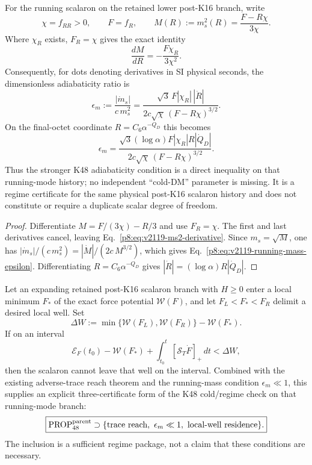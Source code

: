 \documentclass[12pt,a4paper]{article}
\begin{document}
\begin{corollary}
\label{p8:cor:v2119-running-mass-diagnostic}
For the running scalaron on the retained lower post-K16 branch, write
\[
 \chi=f_{RR}>0,
 \qquad F=f_R,
 \qquad M(R):=m_s^2(R)=\frac{F-R\chi}{3\chi}.
\]
Where $\chi_R$ exists, $F_R=\chi$ gives the exact identity
\begin{equation}
 \label{p8:eq:v2119-ms2-derivative}
 \boxed{
 \frac{dM}{dR}=-\frac{F\chi_R}{3\chi^2}.}
\end{equation}
Consequently, for dots denoting derivatives in SI physical seconds,
the dimensionless adiabaticity ratio is
\begin{equation}
 \label{p8:eq:v2119-running-mass-epsilon}
 \boxed{
 \epsilon_m:=\frac{|\dot m_s|}{c\,m_s^2}
 =\frac{\sqrt3\,F|\chi_R|\,|\dot R|}
 {2c\sqrt\chi\,(F-R\chi)^{3/2}}.}
\end{equation}
On the final-octet coordinate
$R=C_6\alpha^{-Q_D}$ this becomes
\[
 \boxed{
 \epsilon_m
 =\frac{\sqrt3(\log\alpha)F|\chi_R|R|\dot Q_D|}
 {2c\sqrt\chi\,(F-R\chi)^{3/2}}.}
\]
Thus the stronger K48 adiabaticity condition is a direct inequality on that
running-mode history; no independent ``cold-DM'' parameter is missing.  It is
a regime certificate for the same physical post-K16 scalaron history and does
not constitute or require a duplicate scalar degree of freedom.
\end{corollary}

\begin{proof}
Differentiate
$M=F/(3\chi)-R/3$ and use $F_R=\chi$.  The first and last derivatives cancel,
leaving Eq.~\eqref{p8:eq:v2119-ms2-derivative}.  Since
$m_s=\sqrt M$, one has
$|\dot m_s|/(c\,m_s^2)=|\dot M|/(2c\,M^{3/2})$, which gives
Eq.~\eqref{p8:eq:v2119-running-mass-epsilon}.  Differentiating
$R=C_6\alpha^{-Q_D}$ gives
$|\dot R|=(\log\alpha)R|\dot Q_D|$.
\end{proof}

\begin{corollary}
\label{p8:cor:v2119-local-well-residence}
Let an expanding retained post-K16 scalaron branch with $H\ge0$ enter a local minimum $F_*$ of the exact force
potential $\mathcal W(F)$, and let $F_L<F_*<F_R$ delimit a desired local well.
Set
\[
 \Delta W
 :=\min\{\mathcal W(F_L),\mathcal W(F_R)\}-\mathcal W(F_*).
\]
If on an interval
\begin{equation}
 \label{p8:eq:v2119-well-residence}
 \boxed{
 \mathcal E_F(t_0)-\mathcal W(F_*)
 +\int_{t_0}^{t}[\mathcal S_T\dot F]_+\,dt
 <\Delta W,}
\end{equation}
then the scalaron cannot leave that well on the interval.  Combined with the
existing adverse-trace reach theorem and the running-mass condition
$\epsilon_m\ll1$, this supplies an explicit three-certificate form of the
K48 cold/regime check on that running-mode branch:
\[
 \boxed{
 \mathrm{PROP}^{\rm parent}_{48}
 \supset
 \{\text{trace reach},\ \epsilon_m\ll1,\ \text{local-well residence}\}.}
\]
The inclusion is a sufficient regime package, not a claim that these
conditions are necessary.
\end{corollary}
\end{document}
